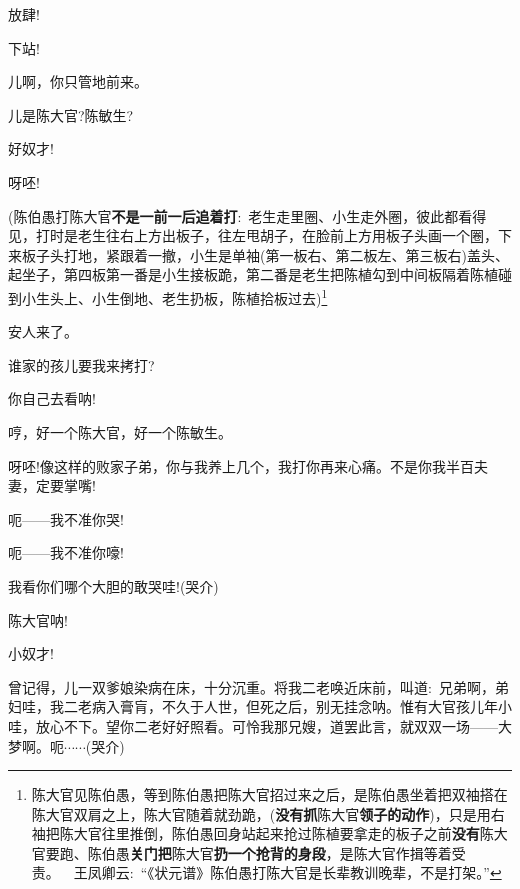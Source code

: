 {放肆!

下站!

儿啊，你只管地前来。

儿是陈大官?陈敏生?

好奴才!

呀呸!


({陈伯愚{\hwfs 打}陈大官{\bfseries\hwfs 不是一前一后追着打}}:~老生{\hwl 走里圈}、小生{\hwl 走外圈}，{\hwfs 彼此都看得见}，{\hwfs 打时是}老生{\hwl 往右上方出板子}，{\hwl 往左甩胡子}，{\hwl 在脸前上方用板子头画一个圈}，{\hwl 下来板子头打地}，{\hwl 紧跟着一撤}，小生{\hwl 是单袖}({\hwfs 第一板右}、{\hwfs 第二板左}、{\hwfs 第三板右}){\hwl 盖头}、{\hwl 起坐子}，{\hwfs 第四板第一番是}小生{\hwl 接板跪}，{\hwfs 第二番是}老生{\hwl 把}陈植{\hwl 勾到中间板隔着}陈植{\hwl 碰到}小生{\hwl 头上}、小生{\hwl 倒地}、老生{\hwl 扔板}，陈植{\hwl 拾板过去})\footnote{陈大官{\hwfs 见}陈伯愚，{\hwfs 等到}陈伯愚{\hwfs 把}陈大官{\hwfs 招过来之后}，{\hwfs 是}陈伯愚{\hwl 坐着把双袖搭在}陈大官{\hwl 双肩之上}，陈大官{\hwl 随着就劲跪}，({\bfseries\hwfs 没有抓}陈大官{\bfseries\hwfs 领子的动作})，{\hwl 只是用右袖把}陈大官{\hwl 往里推倒}，陈伯愚{\hwl 回身站起来抢过}陈植{\hwl 要拿走的板子之前}{\bfseries\hwfs 没有}陈大官{\hwfs 要跑}、陈伯愚{\bfseries\hwfs 关门把}陈大官{\bfseries\hwfs 扔一个抢背的身段}，{\hwl 是}陈大官{\hwl 作揖等着受责}。~~{王凤卿云:~``{\hei 《状元谱》陈伯愚打陈大官是长辈教训晚辈，不是打架。}''}}


安人来了。

谁家的孩儿要我来拷打?

你自己去看呐!

哼，好一个陈大官，好一个陈敏生。

呀呸!像这样的败家子弟，你与我养上几个，我打你再来心痛。不是你我半百夫妻，定要掌嘴!

呃------我不准你哭!

呃------我不准你嚎!

我看你们哪个大胆的敢哭哇!({\hwfs 哭介})

陈大官呐!

小奴才!

曾记得，儿一双爹娘染病在床，十分沉重。将我二老唤近床前，叫道:~兄弟啊，弟妇哇，我二老病入膏肓，不久于人世，但死之后，别无挂念呐。惟有大官孩儿年小哇，放心不下。望你二老好好照看。可怜我那兄嫂，道罢此言，就双双一场------大梦啊。呃$\cdots{}\cdots{}$({\hwfs 哭介})

}
